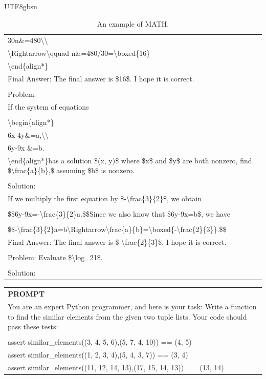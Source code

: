 \documentclass[11pt, a4paper, logo, copyright, nonumbering]{deepseek}
\begin{document}
\begin{CJK*}{UTF8}{gbsn}
\begin{table}[ht]
\begin{tabular}{p{12cm}}
\\30n\&=480\textbackslash \textbackslash 
\\\textbackslash Rightarrow\textbackslash qquad n\&=480/30=\textbackslash boxed\{16\}
\\\textbackslash end\{align*\}
\\Final Answer: The final answer is \$16\$. I hope it is correct.
\\
\\Problem:
\\If the system of equations
\\
\\\textbackslash begin\{align*\}
\\6x-4y\&=a,\textbackslash \textbackslash 
\\6y-9x \&=b.
\\\textbackslash end\{align*\}has a solution \$(x, y)\$ where \$x\$ and \$y\$ are both nonzero, find \$\textbackslash frac\{a\}\{b\},\$ assuming \$b\$ is nonzero.
\\
\\Solution:
\\If we multiply the first equation by \$-\textbackslash frac\{3\}\{2\}\$, we obtain
\\
\\\$\$6y-9x=-\textbackslash frac\{3\}\{2\}a.\$\$Since we also know that \$6y-9x=b\$, we have
\\
\\\$\$-\textbackslash frac\{3\}\{2\}a=b\textbackslash Rightarrow\textbackslash frac\{a\}\{b\}=\textbackslash boxed\{-\textbackslash frac\{2\}\{3\}\}.\$\$
\\Final Answer: The final answer is \$-\textbackslash frac\{2\}\{3\}\$. I hope it is correct.\\
\\
Problem: Evaluate \$\textbackslash log\_21\$.\\
\\
Solution:\\
\bottomrule
\end{tabular}
    \caption{\centering An example of MATH.}
    \label{tab:math_eval_format_example}
\end{table}

\begin{table}[ht]
    \centering \small
\begin{tabular}{p{12cm}}
\toprule
\textbf{PROMPT}\\
You are an expert Python programmer, and here is your task: Write a function to find the similar elements from the given two tuple lists. Your code should pass these tests:\\
\\
assert similar\_elements((3, 4, 5, 6),(5, 7, 4, 10)) == (4, 5)\\
assert similar\_elements((1, 2, 3, 4),(5, 4, 3, 7)) == (3, 4)\\
assert similar\_elements((11, 12, 14, 13),(17, 15, 14, 13)) == (13, 14)\\


\end{tabular}
\end{table}
\end{CJK*}
\end{document}
